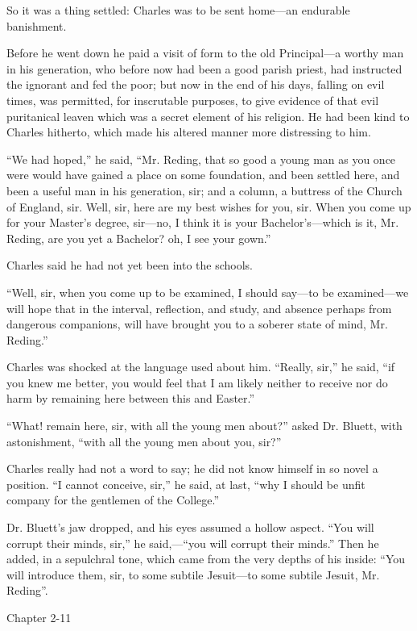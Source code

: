 So it was a thing settled: Charles was to be sent home—an
endurable banishment.

Before he went down he paid a visit of form to the old Principal—a
worthy man in his generation, who before now had been a good parish
priest, had instructed the ignorant and fed the poor; but now in the
end of his days, falling on evil times, was permitted, for inscrutable
purposes, to give evidence of that evil puritanical leaven which was a
secret element of his religion. He had been kind to Charles hitherto,
which made his altered manner more distressing to him.

``We had hoped,'' he said, ``Mr. Reding, that so good a
young man as you once were would have gained a place on some
foundation, and been settled here, and been a useful man in his
generation, sir; and a column, a buttress of the Church of England,
sir. Well, sir, here are my best wishes for you, sir. When you come up
for your Master's degree, sir—no, I think it is your Bachelor's—which
is it, Mr. Reding, are you yet a Bachelor? oh, I see your gown.''

Charles said he had not yet been into the schools.

``Well, sir, when you come up to be examined, I should say—to
be examined—we will hope that in the interval, reflection, and
study, and absence perhaps from dangerous companions, will have
brought you to a soberer state of mind, Mr. Reding.''

Charles was shocked at the language used about him. ``Really,
sir,'' he said, ``if you knew me better, you would feel that I
am likely neither to receive nor do harm by remaining here between
this and Easter.''

``What! remain here, sir, with all the young men about?''
asked Dr. Bluett, with astonishment, ``with all the young men
about you, sir?''

Charles really had not a word to say; he did not know himself in so
novel a position. ``I cannot conceive, sir,'' he said, at
last, ``why I should be unfit company for the gentlemen of the
College.''

Dr. Bluett's jaw dropped, and his eyes assumed a hollow aspect.
``You will corrupt their minds, sir,'' he said,—``you
will corrupt their minds.'' Then he added, in a sepulchral tone,
which came from the very depths of his inside: ``You will
introduce them, sir, to some subtile Jesuit—to some subtile Jesuit,
Mr. Reding''.

Chapter 2-11



